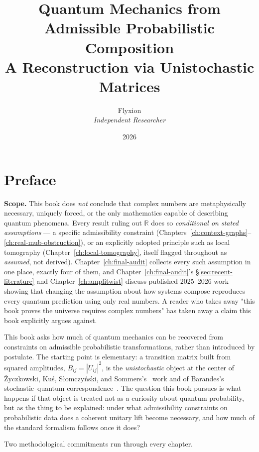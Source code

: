 \documentclass[11pt]{book}
\title{Quantum Mechanics from Admissible Probabilistic Composition\\
\large A Reconstruction via Unistochastic Matrices}
\author{Flyxion\\ \textit{Independent Researcher}}
\date{2026}
\newcommand{\scopetitle}[1]{{\bfseries Scope. }#1}
\theoremstyle{plain}
\theoremstyle{definition}
\theoremstyle{remark}
\newcommand{\R}{\mathbb{R}}
\begin{document}
\frontmatter
\maketitle

\tableofcontents

\chapter*{Preface}

\begin{scopebox}
\scopetitle{}This book does \emph{not} conclude that complex numbers are
metaphysically necessary, uniquely forced, or the only mathematics
capable of describing quantum phenomena. Every result ruling out $\R$ does
so \emph{conditional on stated assumptions} — a specific admissibility
constraint (Chapters~\ref{ch:context-graphs}--\ref{ch:real-mub-obstruction}),
or an explicitly adopted principle such as local tomography
(Chapter~\ref{ch:local-tomography}, itself flagged throughout as
\emph{assumed}, not derived). Chapter~\ref{ch:final-audit} collects every
such assumption in one place, exactly four of them, and
Chapter~\ref{ch:final-audit}'s \S\ref{sec:recent-literature} and
Chapter~\ref{ch:amplitwist} discuss published 2025--2026 work showing that
changing the assumption about how systems compose reproduces every quantum
prediction using only real numbers. A reader who takes away "this book
proves the universe requires complex numbers" has taken away a claim this
book explicitly argues against.
\end{scopebox}

This book asks how much of quantum mechanics can be recovered from
constraints on admissible probabilistic transformations, rather than
introduced by postulate. The starting point is elementary: a transition
matrix built from squared amplitudes, $B_{ij}=|U_{ij}|^2$, is the
\emph{unistochastic} object at the center of Życzkowski, Kuś, Słomczyński,
and Sommers's~\cite{zyczkowski2003} work and of Barandes's
stochastic--quantum correspondence~\cite{barandes}. The question this
book pursues is what happens if that object is treated not as a curiosity
about quantum probability, but as the thing to be explained: under what
admissibility constraints on probabilistic data does a coherent unitary lift
become necessary, and how much of the standard formalism follows once it
does?

Two methodological commitments run through every chapter.
\end{document}
